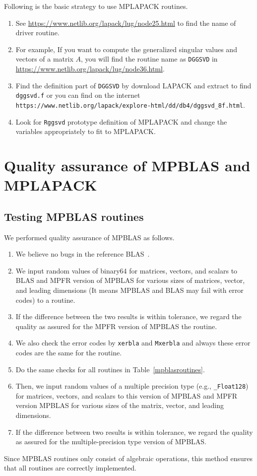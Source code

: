 \documentclass[12pt]{article}
\begin{document}
Following is the basic strategy to use MPLAPACK routines.
\begin{enumerate}
\item See \url{https://www.netlib.org/lapack/lug/node25.html} to find the name of driver routine.
\item For example, If you want to compute the generalized singular values and vectors of a matrix $A$, you will find the routine name as {\tt DGGSVD} in \url{https://www.netlib.org/lapack/lug/node36.html}.
\item Find the definition part of {\tt DGGSVD} by download LAPACK and extract to find {\tt dggsvd.f} or you can find on the internet {\tt https://www.netlib.org/lapack/explore-html/dd/db4/dggsvd\_8f.html}.
\item Look for {\tt Rggsvd} prototype definition of MPLAPACK and change the variables appropriately to fit to MPLAPACK.
\end{enumerate}

\section{Quality assurance of MPBLAS and MPLAPACK}
\label{sec:howtotest}
\subsection{Testing MPBLAS routines}
We performed quality assurance of MPBLAS as follows. 
\begin{enumerate}
    \item We believe no bugs in the reference BLAS~\cite{10.1145/567806.567807}.
    \item We input random values of binary64 for matrices, vectors, and scalars to BLAS and MPFR version of MPBLAS for various sizes of matrices, vector, and leading dimensions (It means MPBLAS and BLAS may fail with error codes) to a routine.
    \item If the difference between the two results is within tolerance, we regard the quality as assured for the MPFR version of MPBLAS the routine.
    \item We also check the error codes by {\tt xerbla} and {\tt Mxerbla} and always these error codes are the same for the routine.
    \item Do the same checks for all routines in Table~\ref{mpblasroutines}.
    \item Then, we input random values of a multiple precision type (e.g., {\tt \_Float128}) for matrices, vectors, and scalars to this version of MPBLAS and MPFR version MPBLAS for various sizes of the matrix, vector, and leading dimensions.
    \item If the difference between two results is within tolerance, we regard the quality as assured for the multiple-precision type version of MPBLAS.
\end{enumerate}
Since MPBLAS routines only consist of algebraic operations, this method ensures that all routines are correctly implemented. 
\end{document}
